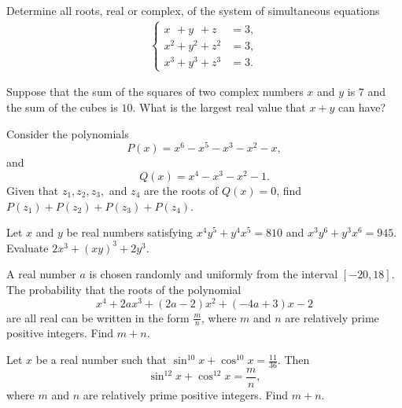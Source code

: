 \documentclass[12pt,a4paper]{memoir}
\theoremstyle{definition}
\begin{document}
\begin{question}[name={1973 USAMO}]
	Determine all roots, real or complex, of the system of simultaneous equations
	\begin{align*} 
		\begin{cases}
			x\phantom{^2}+y\phantom{^2}+z\phantom{^2} &= 3, \\
			x^2+y^2+z^2 &= 3, \\
			x^3+y^3+z^3 &= 3.
		\end{cases}
	\end{align*}
\end{question}



\begin{question}[name={1983 AIME}]
	Suppose that the sum of the squares of two complex numbers $x$ and $y$ is $7$ and the sum of the cubes is $10$. What is the largest real value that $x + y$ can have?
\end{question}

\begin{question}[name={2003 AIME}]
	Consider the polynomials \[P(x)=x^{6}-x^{5}-x^{3}-x^{2}-x,\] and \[Q(x)=x^{4}-x^{3}-x^{2}-1.\] Given that $z_{1},z_{2},z_{3},$ and $z_{4}$ are the roots of $Q(x)=0$, find $P(z_{1})+P(z_{2})+P(z_{3})+P(z_{4})$.
\end{question}

\begin{question}[name={2015 AIME}]
	Let $x$ and $y$ be real numbers satisfying $x^4y^5+y^4x^5=810$ and $x^3y^6+y^3x^6=945$. Evaluate $2x^3+(xy)^3+2y^3$.	
\end{question}


\begin{question}[name={2018 AIME}]
	A real number $a$ is chosen randomly and uniformly from the interval $[-20, 18]$. The probability that the roots of the polynomial\[x^4 + 2ax^3 + (2a-2)x^2 + (-4a+3)x - 2\]are all real can be written in the form $\tfrac{m}{n}$, where $m$ and $n$ are relatively prime positive integers. Find $m+n$.
\end{question}

\begin{question}[name={2019 AIME}]
	Let $x$ be a real number such that $\sin^{10}x+\cos^{10} x = \tfrac{11}{36}$. Then 
	\[\sin^{12}x+\cos^{12} x = \dfrac{m}{n},\] where $m$ and $n$ are relatively prime positive integers. Find $m+n$.
\end{question}
\end{document}
